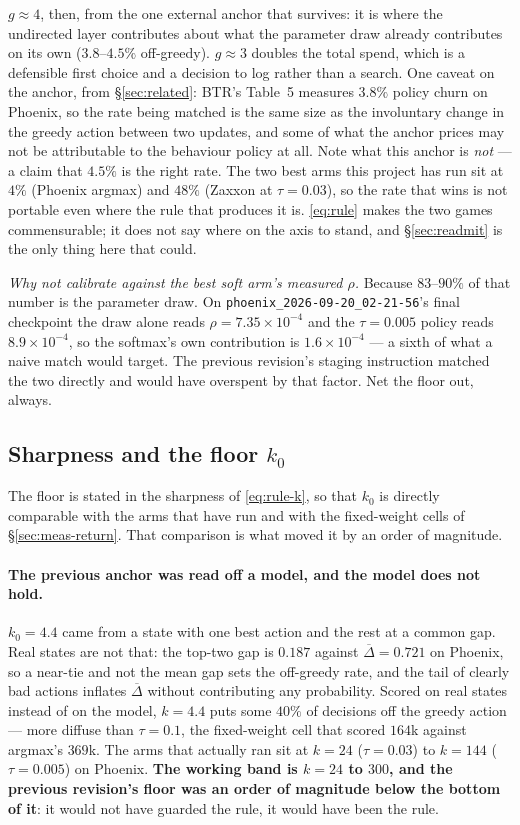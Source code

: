 \documentclass{article}
\newcommand{\gapbar}{\overline{\Delta}}
\begin{document}
\textbf{$g \approx 4$}, then, from the one external anchor that survives: it is where the
undirected layer contributes about what the parameter draw already contributes on its own
($3.8$--$4.5\%$ off-greedy). $g \approx 3$ doubles the total spend, which is a defensible first
choice and a decision to log rather than a search. One caveat on the anchor, from
\S\ref{sec:related}: BTR's Table~5 measures $3.8\%$ policy churn on Phoenix, so the rate being
matched is the same size as the involuntary change in the greedy action between two updates, and
some of what the anchor prices may not be attributable to the behaviour policy at all. Note what this anchor is \emph{not} --- a
claim that $4.5\%$ is the right rate. The two best arms this project has run sit at $4\%$
(Phoenix argmax) and $48\%$ (Zaxxon at $\tau = 0.03$), so the rate that wins is not portable even
where the rule that produces it is. \eqref{eq:rule} makes the two games commensurable; it does
not say where on the axis to stand, and \S\ref{sec:readmit} is the only thing here that could.

\emph{Why not calibrate against the best soft arm's measured $\rho$.} Because $83$--$90\%$ of that
number is the parameter draw. On \texttt{phoenix\_2026-09-20\_02-21-56}'s final checkpoint the
draw alone reads $\rho = 7.35\times10^{-4}$ and the $\tau = 0.005$ policy reads
$8.9\times10^{-4}$, so the softmax's own contribution is $1.6\times10^{-4}$ --- a sixth of what a
naive match would target. The previous revision's staging instruction matched the two directly
and would have overspent by that factor. Net the floor out, always.


\subsection{Sharpness and the floor $k_0$}
\label{sec:meas-k}

The floor is stated in the sharpness of \eqref{eq:rule-k}, so that $k_0$ is directly comparable
with the arms that have run and with the fixed-weight cells of \S\ref{sec:meas-return}. That
comparison is what moved it by an order of magnitude.

\paragraph{The previous anchor was read off a model, and the model does not hold.} $k_0 = 4.4$
came from a state with one best action and the rest at a common gap. Real states are not that:
the top-two gap is $0.187$ against $\gapbar = 0.721$ on Phoenix, so a near-tie and not the mean
gap sets the off-greedy rate, and the tail of clearly bad actions inflates $\gapbar$ without
contributing any probability. Scored on real states instead of on the model, $k = 4.4$ puts some
$40\%$ of decisions off the greedy action --- more diffuse than $\tau = 0.1$, the fixed-weight
cell that scored $164$k against argmax's $369$k. The arms that actually ran sit at $k = 24$
($\tau = 0.03$) to $k = 144$ ($\tau = 0.005$) on Phoenix. \textbf{The working band is $k = 24$ to
$300$, and the previous revision's floor was an order of magnitude below the bottom of it}: it
would not have guarded the rule, it would have been the rule.
\end{document}
